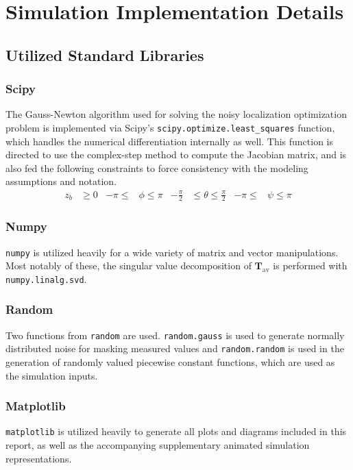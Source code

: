 \documentclass{report}
\begin{document}
	\chapter{Simulation Implementation Details}
		\section{Utilized Standard Libraries}
			\subsection{Scipy\textsuperscript{\cite{scipy}}}
				The Gauss-Newton algorithm used for solving the noisy localization optimization problem is implemented via Scipy's \lstinline{scipy.optimize.least_squares} function, which handles the numerical differentiation internally as well. This function is directed to use the complex-step method to compute the Jacobian matrix, and is also fed the following constraints to force consistency with the modeling assumptions and notation.
				\begin{align*}
					z_b&\geq0 & -\pi\leq&\phi\leq\pi & -\frac{\pi}{2}&\leq\theta\leq\frac{\pi}{2} & -\pi\leq&\psi\leq\pi 
				\end{align*}
			\subsection{Numpy\textsuperscript{\cite{scipy}}}
				\lstinline{numpy} is utilized heavily for a wide variety of matrix and vector manipulations. Most notably of these, the singular value decomposition of $\mathbf{T}_{\text{av}}$ is performed with \lstinline{numpy.linalg.svd}.
			\subsection{Random\textsuperscript{\cite{rnd}}}
				Two functions from \lstinline{random} are used. \lstinline{random.gauss} is used to generate normally distributed noise for masking measured values and \lstinline{random.random} is used in the generation of randomly valued piecewise constant functions, which are used as the simulation inputs.
			\subsection{Matplotlib\textsuperscript{\cite{plt}}}
				\lstinline{matplotlib} is utilized heavily to generate all plots and diagrams included in this report, as well as the accompanying supplementary animated simulation representations.
\end{document}
